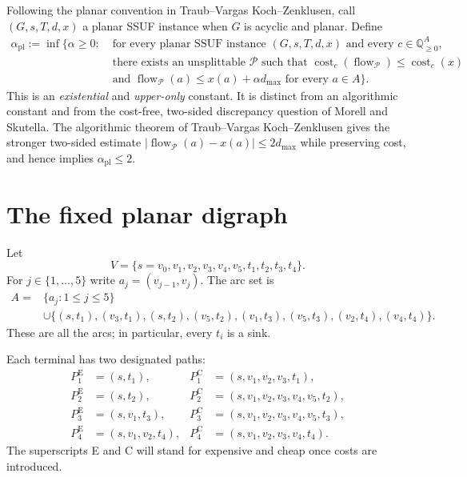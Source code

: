 \documentclass[11pt]{article}
\theoremstyle{remark}
\newcommand{\Q}{\mathbb{Q}}
\newcommand{\apl}{\alpha_{\mathrm{pl}}}
\newcommand{\flow}{\operatorname{flow}}
\newcommand{\cost}{\operatorname{cost}}
\newcommand{\Epath}{P^{\mathrm E}}
\newcommand{\Cpath}{P^{\mathrm C}}
\begin{document}
Following the planar convention in Traub--Vargas Koch--Zenklusen, call
$(G,s,T,d,x)$ a planar SSUF instance when $G$ is acyclic and planar.  Define
\begin{align*}
\apl:=\inf\bigl\{\alpha\ge0:\;&\text{for every planar SSUF instance }
 (G,s,T,d,x)\text{ and every }c\in\Q_{\ge0}^A,\\[-1mm]
&\text{there exists an unsplittable }\mathcal P\text{ such that }
\cost_c(\flow_{\mathcal P})\le\cost_c(x)\\[-1mm]
&\text{and }\flow_{\mathcal P}(a)\le x(a)+\alpha d_{\max}
\text{ for every }a\in A\bigr\}.
\end{align*}
This is an \emph{existential} and \emph{upper-only} constant.  It is distinct
from an algorithmic constant and from the cost-free, two-sided discrepancy
question of Morell and Skutella.  The algorithmic theorem of
Traub--Vargas Koch--Zenklusen gives the stronger two-sided estimate
$|\flow_{\mathcal P}(a)-x(a)|\le2d_{\max}$ while preserving cost, and hence
implies $\apl\le2$.

\section{The fixed planar digraph}

Let
\[
 V=\{s=v_0,v_1,v_2,v_3,v_4,v_5,t_1,t_2,t_3,t_4\}.
\]
For $j\in\{1,\dots,5\}$ write $a_j=(v_{j-1},v_j)$.  The arc set is
\begin{align*}
 A={}&\{a_j:1\le j\le5\}\\
 &\cup\{(s,t_1),(v_3,t_1),(s,t_2),(v_5,t_2),
 (v_1,t_3),(v_5,t_3),(v_2,t_4),(v_4,t_4)\}.
\end{align*}
These are all the arcs; in particular, every $t_i$ is a sink.

Each terminal has two designated paths:
\begin{align*}
\Epath_1&=(s,t_1),
&\Cpath_1&=(s,v_1,v_2,v_3,t_1),\\
\Epath_2&=(s,t_2),
&\Cpath_2&=(s,v_1,v_2,v_3,v_4,v_5,t_2),\\
\Epath_3&=(s,v_1,t_3),
&\Cpath_3&=(s,v_1,v_2,v_3,v_4,v_5,t_3),\\
\Epath_4&=(s,v_1,v_2,t_4),
&\Cpath_4&=(s,v_1,v_2,v_3,v_4,t_4).
\end{align*}
The superscripts E and C will stand for expensive and cheap once costs are
introduced.
\end{document}
